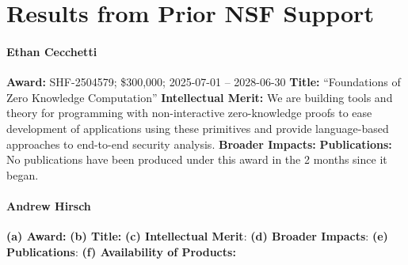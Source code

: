 \section{Results from Prior NSF Support}
\label{sec:prior_results}

\paragraph{Ethan Cecchetti}
\textbf{Award:} SHF-2504579; \$300,000; 2025-07-01 -- 2028-06-30
\textbf{Title:} ``Foundations of Zero Knowledge Computation''
\textbf{Intellectual Merit:} We are building tools and theory for programming with non-interactive zero-knowledge proofs
to ease development of applications using these primitives and provide language-based approaches to end-to-end security analysis.
\textbf{Broader Impacts:} 
\textbf{Publications:} No publications have been produced under this award in the 2 months since it began.

\paragraph{Andrew Hirsch}
\textbf{(a) Award:} 
\textbf{(b) Title:} 
\textbf{(c) Intellectual Merit}:  
\textbf{(d) Broader Impacts}:  
\textbf{(e) Publications}:
\textbf{(f) Availability of Products:} 

